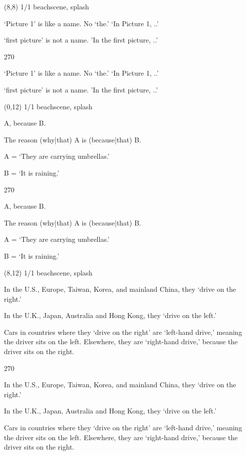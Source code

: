 \documentclass[a4paper]{article}
\newenvironment{itemize*}%
{\begin{itemize}%
 \setlength{\itemsep}{0.0cm}%
 \setlength{\parsep}{0pt}%
 \setlength{\parskip}{0pt}}%
{\end{itemize}}
\newcommand{\mycard}[3]{%
	\small #1 #2
	\par
	\parbox[t][6.8cm][c]{9.5cm}{%
	\par
	\myleft{#3}
	\par
	\myright{#3}
	}
}
\newcommand{\myleft}[1]{%
	\begin{sideways}
	\hspace*{-0.9cm}
		\parbox[t][2.7cm][t]{6.5cm}{%
		\large #1
		}
	\end{sideways}
}
\newcommand{\myright}[1]{%
	\hspace*{6.5cm}
	\begin{turn}{270}
	\hspace*{-7.1cm}
		\parbox[t][2.7cm][t]{6.5cm}{%
		\large #1
		}
	\end{turn}
}
\begin{document}
\begin{textblock}{8}(8,8)
\mycard{1/1}{beachscene, splash}{
\begin{itemize*}
\item `Picture 1' is like a name. No `the.' `In Picture 1, ..'
\item `first picture' is not a name. 'In the first picture, ..'
\end{itemize*}
}
\end{textblock}

\begin{textblock}{8}(0,12)
\mycard{1/1}{beachscene, splash}{
\begin{itemize*}
\item A, because B.
\item The reason (why|that) A is (because|that) B.
\item A = `They are carrying umbrellas.'
\item B = `It is raining.'
\end{itemize*}
}
\end{textblock}

\begin{textblock}{8}(8,12)
\mycard{1/1}{beachscene, splash}{
\normalsize
\begin{itemize*}
\item In the U.S., Europe, Taiwan, Korea, and mainland China, they `drive on the right.'
\item In the U.K., Japan, Australia and Hong Kong, they `drive on the left.'
\item Cars in countries where they `drive on the right' are `left-hand drive,' meaning the driver sits on the left. Elsewhere, they are `right-hand drive,' because the driver sits on the right.
\end{itemize*}
}
\end{textblock}

\null
\newpage
\end{document}

